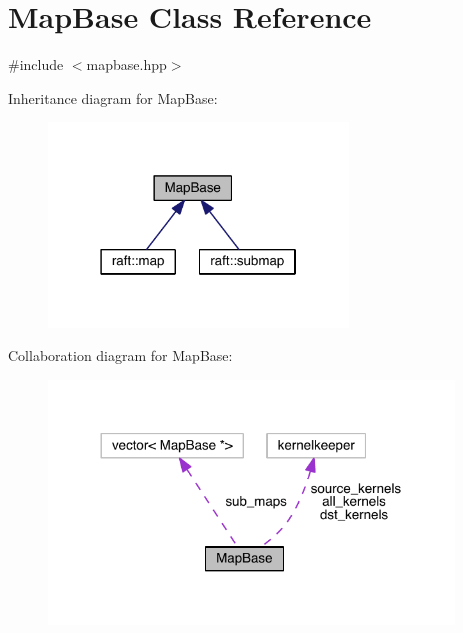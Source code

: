 \hypertarget{class_map_base}{}\section{Map\+Base Class Reference}
\label{class_map_base}


{\ttfamily \#include $<$mapbase.\+hpp$>$}



Inheritance diagram for Map\+Base\+:
\nopagebreak
\begin{figure}[H]
\begin{center}
\leavevmode
\includegraphics[width=226pt]{class_map_base__inherit__graph}
\end{center}
\end{figure}


Collaboration diagram for Map\+Base\+:
\nopagebreak
\begin{figure}[H]
\begin{center}
\leavevmode
\includegraphics[width=305pt]{class_map_base__coll__graph}
\end{center}
\end{figure}
